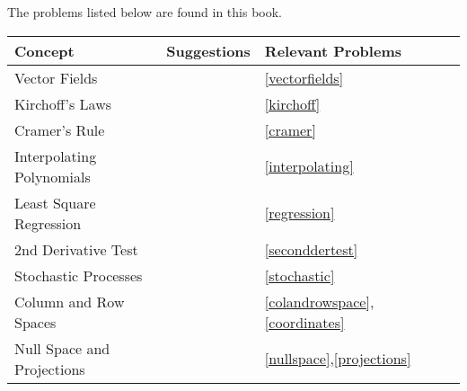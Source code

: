 The problems listed below are found in this book.
\begin{center}
\begin{tabular}{|l|l|l|l|l|}
\hline
Concept&Suggestions&Relevant Problems\\ \hline
Vector Fields&&\ref{vectorfields}\\ \hline
Kirchoff's Laws&&\ref{kirchoff}\\ \hline
Cramer's Rule&&\ref{cramer}\\ \hline
Interpolating Polynomials&&\ref{interpolating}\\ \hline
Least Square Regression&&\ref{regression}\\ \hline
2nd Derivative Test&&\ref{seconddertest}\\ \hline
Stochastic Processes&&\ref{stochastic}\\ \hline
Column and Row Spaces&&\ref{colandrowspace},\ref{coordinates}\\ \hline
Null Space and Projections&&\ref{nullspace},\ref{projections}\\ \hline
\end{tabular}
\end{center}



